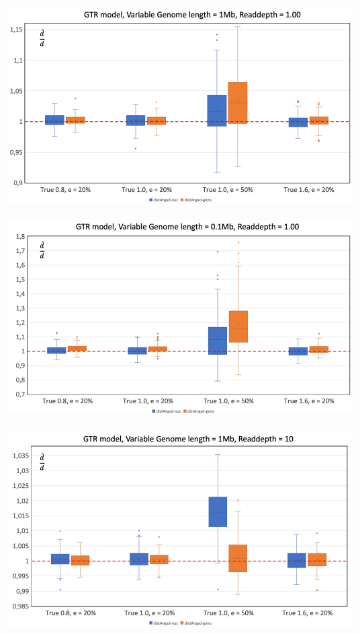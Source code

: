 \documentclass{article}
\begin{document}
\begin{figure}
\begin{subfigure}{.5\textwidth}
  \centering
  \includegraphics[width=.99\linewidth]{BiasGTRRD1_1M.png}  
  \caption{}
  \label{fig:BiasGTRRD1_1M}
\end{subfigure}
\begin{subfigure}{.5\textwidth}
  \centering
  \includegraphics[width=.99\linewidth]{BiasGTRRD1_01M.png}  
  \caption{}
  \label{fig:BiasGTRRD1_01M}
\end{subfigure}
\newline
\begin{subfigure}{.5\textwidth}
  \centering
  \includegraphics[width=.99\linewidth]{BiasGTRRD10_1M.png}  

\end{subfigure}
\end{figure}
\end{document}

